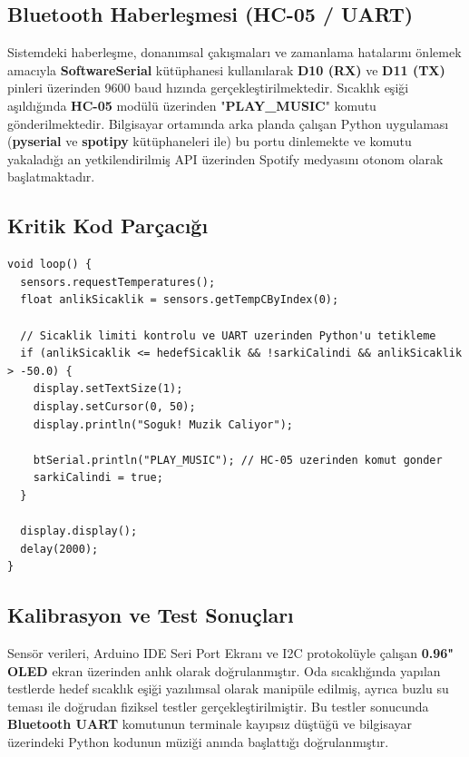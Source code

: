 \documentclass[12pt, a4paper]{article}
\begin{document}
\subsection{Bluetooth Haberleşmesi (HC-05 / UART)}

Sistemdeki haberleşme, donanımsal çakışmaları ve zamanlama hatalarını önlemek amacıyla \textbf{SoftwareSerial} kütüphanesi kullanılarak \textbf{D10 (RX)} ve \textbf{D11 (TX) }pinleri üzerinden 9600 baud hızında gerçekleştirilmektedir. Sıcaklık eşiği aşıldığında \textbf{HC-05} modülü üzerinden "\textbf{PLAY\_MUSIC}" komutu gönderilmektedir. Bilgisayar ortamında arka planda çalışan Python uygulaması (\textbf{pyserial} ve \textbf{spotipy} kütüphaneleri ile) bu portu dinlemekte ve komutu yakaladığı an yetkilendirilmiş API üzerinden Spotify medyasını otonom olarak başlatmaktadır.

\subsection{Kritik Kod Parçacığı}

\begin{lstlisting}[style=cstyle, caption={Sıcaklık eşiği kontrolü ve UART tetiklemesi}]
void loop() {
  sensors.requestTemperatures(); 
  float anlikSicaklik = sensors.getTempCByIndex(0);

  // Sicaklik limiti kontrolu ve UART uzerinden Python'u tetikleme
  if (anlikSicaklik <= hedefSicaklik && !sarkiCalindi && anlikSicaklik > -50.0) {
    display.setTextSize(1);
    display.setCursor(0, 50);
    display.println("Soguk! Muzik Caliyor");
    
    btSerial.println("PLAY_MUSIC"); // HC-05 uzerinden komut gonder
    sarkiCalindi = true; 
  } 
  
  display.display();
  delay(2000); 
}
\end{lstlisting}

\subsection{Kalibrasyon ve Test Sonuçları}

Sensör verileri, Arduino IDE Seri Port Ekranı ve I2C protokolüyle çalışan \textbf{ 0.96" OLED}  ekran üzerinden anlık olarak doğrulanmıştır. Oda sıcaklığında yapılan testlerde hedef sıcaklık eşiği yazılımsal olarak manipüle edilmiş, ayrıca buzlu su teması ile doğrudan fiziksel testler gerçekleştirilmiştir. Bu testler sonucunda \textbf{Bluetooth UART} komutunun terminale kayıpsız düştüğü ve bilgisayar üzerindeki Python kodunun müziği anında başlattığı doğrulanmıştır.
\end{document}
